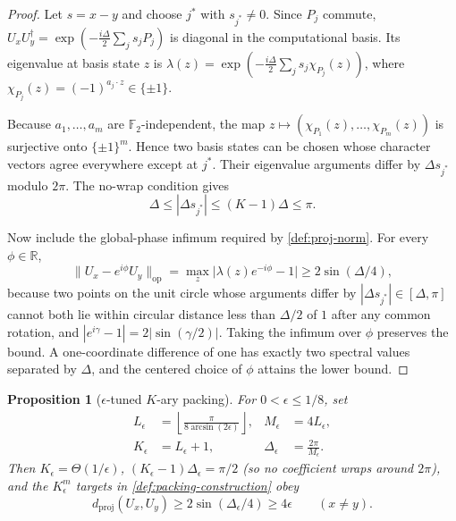 \documentclass[a4paper,twocolumn,10pt,unpublished]{quantumarticle}
\newtheorem{proposition}{Proposition}
\newcommand{\Ftwo}{\mathbb{F}_2}
\begin{document}
\begin{proof}
Let $s=x-y$ and choose $j^*$ with $s_{j^*}\neq0$.
Since $P_j$ commute, $U_x U_y^\dagger = \exp(-\frac{i\Delta}{2}\sum_j s_j P_j)$
is diagonal in the computational basis. Its eigenvalue at basis state $z$ is
$\lambda(z) = \exp(-\frac{i\Delta}{2}\sum_j s_j \chi_{P_j}(z))$,
where $\chi_{P_j}(z) = (-1)^{a_j \cdot z} \in \{\pm 1\}$.

Because $a_1,\ldots,a_m$ are $\Ftwo$-independent, the map
$z \mapsto (\chi_{P_1}(z),\ldots,\chi_{P_m}(z))$ is surjective onto
$\{\pm 1\}^m$. Hence two basis states can be chosen whose character
vectors agree everywhere except at $j^*$.  Their eigenvalue arguments
differ by $\Delta s_{j^*}$ modulo $2\pi$.  The no-wrap condition gives
\begin{equation*}
 \Delta\leq |\Delta s_{j^*}|\leq(K-1)\Delta\leq\pi .
\end{equation*}

Now include the global-phase infimum required by
\cref{def:proj-norm}. For every $\phi \in \mathbb{R}$,
\begin{equation}\label{eq:packing-sep-norm}
\|U_x - e^{i\phi} U_y\|_{\mathrm{op}}
 = \max_z \bigl|\lambda(z)e^{-i\phi} - 1\bigr|
 \geq 2\sin(\Delta/4),
\end{equation}
because two points on the unit circle whose arguments differ by
$|\Delta s_{j^*}|\in[\Delta,\pi]$ cannot both lie within circular distance
less than $\Delta/2$ of $1$ after any common rotation, and
$|e^{i\gamma} - 1| = 2|\sin(\gamma/2)|$. Taking the infimum over $\phi$
preserves the bound. A one-coordinate difference of one has exactly two
spectral values separated by $\Delta$, and the centered choice of $\phi$
attains the lower bound.
\end{proof}

\begin{proposition}[$\epsilon$-tuned $K$-ary packing]
\label{prop:epsilon-packing}
For $0<\epsilon\leq1/8$, set
\begin{equation}\label{eq:epsilon-codebook}
\begin{aligned}
 L_\epsilon&=\left\lfloor
  \frac{\pi}{8\arcsin(2\epsilon)}\right\rfloor,&
 M_\epsilon&=4L_\epsilon,\\
 K_\epsilon&=L_\epsilon+1,&
 \Delta_\epsilon&=\frac{2\pi}{M_\epsilon}.
\end{aligned}
\end{equation}
Then $K_\epsilon=\Theta(1/\epsilon)$,
$(K_\epsilon-1)\Delta_\epsilon=\pi/2$ (so no coefficient wraps around
$2\pi$), and the $K_\epsilon^m$ targets in
\cref{def:packing-construction} obey
\begin{equation}\label{eq:epsilon-separation}
 d_{\mathrm{proj}}(U_x,U_y)
 \geq2\sin(\Delta_\epsilon/4)\geq4\epsilon
 \qquad(x\neq y).
\end{equation}
\end{proposition}
\end{document}
